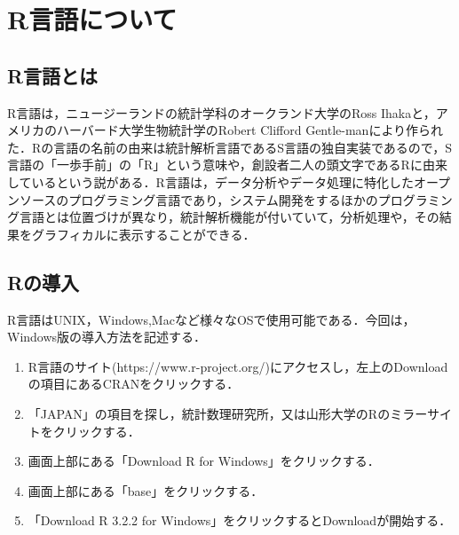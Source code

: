 \chapter{R言語について}

\section{R言語とは}
R言語は，ニュージーランドの統計学科のオークランド大学のRoss Ihakaと，アメリカのハーバード大学生物統計学のRobert Clifford Gentle-manにより作られた．Rの言語の名前の由来は統計解析言語であるS言語の独自実装であるので，S言語の「一歩手前」の「R」という意味や，創設者二人の頭文字であるRに由来しているという説がある．R言語は，データ分析やデータ処理に特化したオープンソースのプログラミング言語であり，システム開発をするほかのプログラミング言語とは位置づけが異なり，統計解析機能が付いていて，分析処理や，その結果をグラフィカルに表示することができる．



\section{Rの導入}
R言語はUNIX，Windows,Macなど様々なOSで使用可能である．今回は，Windows版の導入方法を記述する．

\begin{enumerate}

\item R言語のサイト(https://www.r-project.org/)にアクセスし，左上のDownloadの項目にあるCRANをクリックする．
\item 「JAPAN」の項目を探し，統計数理研究所，又は山形大学のRのミラーサイトをクリックする．
\item 画面上部にある「Download R for Windows」をクリックする．
\item 画面上部にある「base」をクリックする．
\item 「Download R 3.2.2 for Windows」をクリックするとDownloadが開始する．



\end{enumerate}

